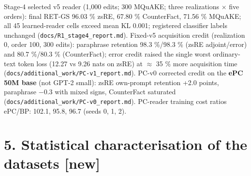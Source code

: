 \documentclass[10pt,a4paper]{article}
\begin{document}
Stage-4 selected v5 reader (1,000 edits; 300 MQuAKE; three realizations $\times$ five orders): final RET-GS 96.03 \% zsRE, 67.80 \% CounterFact, 71.56 \% MQuAKE; all 45 learned-reader cells exceed mean KL 0.001; registered classifier labels unchanged (\texttt{docs/R1\_stage4\_report.md}). Fixed-v5 acquisition credit (realization 0, order 100, 300 edits): paraphrase retention 98.3 \%/98.3 \% (zsRE adjoint/error) and 80.7 \%/80.3 \% (CounterFact); error credit raised the single worst ordinary-text token loss (12.27 vs 9.26 nats on zsRE) at $\approx$ 35 \% more acquisition time (\texttt{docs/additional\_work/PC-v1\_report.md}). PC-v0 corrected credit on the \textbf{ePC 50M base} (not GPT-2 small): zsRE own-prompt retention +2.0 points, paraphrase $-$0.3 with mixed signs, CounterFact saturated (\texttt{docs/additional\_work/PC-v0\_report.md}). PC-reader training cost ratios ePC/BP: 102.1, 95.8, 96.7 (seeds 0, 1, 2).



\section*{5. Statistical characterisation of the datasets [new]}
\end{document}
